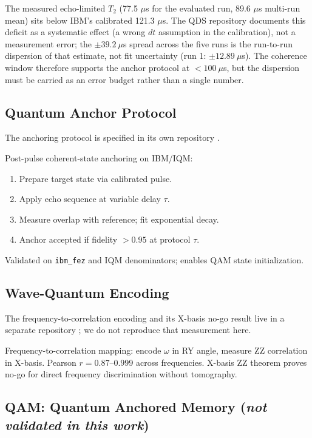 \documentclass[sigconf,anonymous=false]{acmart}
\begin{document}
The measured echo-limited $T_2$ (77.5 $\mu$s for the evaluated run, 89.6 $\mu$s
multi-run mean) sits below IBM's calibrated 121.3 $\mu$s. The QDS repository
documents this deficit as a systematic effect (a wrong $dt$ assumption in the
calibration), not a measurement error; the $\pm 39.2\ \mu$s spread across the five
runs is the run-to-run dispersion of that estimate, not fit uncertainty
(run 1: $\pm 12.89\ \mu$s). The coherence window therefore supports the anchor
protocol at $< 100\ \mu$s, but the dispersion must be carried as an error budget
rather than a single number.

\subsection{Quantum Anchor Protocol}

The anchoring protocol is specified in its own repository \cite{QuantumAnchor}.

Post-pulse coherent-state anchoring on IBM/IQM:
\begin{enumerate}
\item Prepare target state via calibrated pulse.
\item Apply echo sequence at variable delay $\tau$.
\item Measure overlap with reference; fit exponential decay.
\item Anchor accepted if fidelity $> 0.95$ at protocol $\tau$.
\end{enumerate}
Validated on \texttt{ibm\_fez} and IQM denominators; enables QAM state initialization.

\subsection{Wave-Quantum Encoding}

The frequency-to-correlation encoding and its X-basis no-go result live in a separate
repository \cite{WaveQuantum}; we do not reproduce that measurement here.

Frequency-to-correlation mapping: encode $\omega$ in RY angle, measure ZZ correlation in X-basis. Pearson $r = 0.87$--$0.999$ across frequencies. X-basis ZZ theorem proves no-go for direct frequency discrimination without tomography.

\subsection{QAM: Quantum Anchored Memory (\emph{not validated in this work})}
\label{sec:qam}
\end{document}
